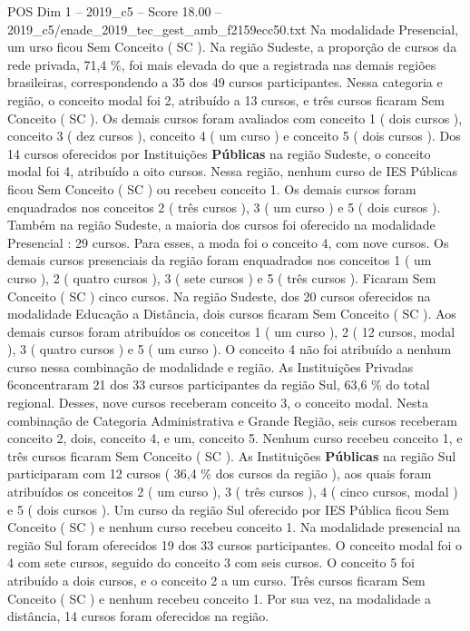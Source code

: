 \begin{textsample}{POS Dim 1 – 2019\_c5 – Score 18.00 – 2019\_c5/enade\_2019\_tec\_gest\_amb\_f2159ecc50.txt}
Na modalidade Presencial, um urso ficou Sem Conceito ( SC ).
Na região Sudeste, a proporção de cursos da rede privada, 71,4 \%, foi mais elevada do que a registrada nas demais regiões brasileiras, correspondendo a 35 dos 49 cursos participantes.
Nessa categoria e região, o conceito modal foi 2, atribuído a 13 cursos, e três cursos ficaram Sem Conceito ( SC ).
Os demais cursos foram avaliados com conceito 1 ( dois cursos ), conceito 3 ( dez cursos ), conceito 4 ( um curso ) e conceito 5 ( dois cursos ).
Dos 14 cursos oferecidos por Instituições \textbf{Públicas} na região Sudeste, o conceito modal foi 4, atribuído a oito cursos.
Nessa região, nenhum curso de IES Públicas ficou Sem Conceito ( SC ) ou recebeu conceito 1.
Os demais cursos foram enquadrados nos conceitos 2 ( três cursos ), 3 ( um curso ) e 5 ( dois cursos ).
Também na região Sudeste, a maioria dos cursos foi oferecido na modalidade Presencial : 29 cursos.
Para esses, a moda foi o conceito 4, com nove cursos.
Os demais cursos presenciais da região foram enquadrados nos conceitos 1 ( um curso ), 2 ( quatro cursos ), 3 ( sete cursos ) e 5 ( três cursos ).
Ficaram Sem Conceito ( SC ) cinco cursos.
Na região Sudeste, dos 20 cursos oferecidos na modalidade Educação a Distância, dois cursos ficaram Sem Conceito ( SC ).
Aos demais cursos foram atribuídos os conceitos 1 ( um curso ), 2 ( 12 cursos, modal ), 3 ( quatro cursos ) e 5 ( um curso ).
O conceito 4 não foi atribuído a nenhum curso nessa combinação de modalidade e região.
As Instituições Privadas 6concentraram 21 dos 33 cursos participantes da região Sul, 63,6 \% do total regional.
Desses, nove cursos receberam conceito 3, o conceito modal.
Nesta combinação de Categoria Administrativa e Grande Região, seis cursos receberam conceito 2, dois, conceito 4, e um, conceito 5.
Nenhum curso recebeu conceito 1, e três cursos ficaram Sem Conceito ( SC ).
As Instituições \textbf{Públicas} na região Sul participaram com 12 cursos ( 36,4 \% dos cursos da região ), aos quais foram atribuídos os conceitos 2 ( um curso ), 3 ( três cursos ), 4 ( cinco cursos, modal ) e 5 ( dois cursos ).
Um curso da região Sul oferecido por IES Pública ficou Sem Conceito ( SC ) e nenhum curso recebeu conceito 1.
Na modalidade presencial na região Sul foram oferecidos 19 dos 33 cursos participantes.
O conceito modal foi o 4 com sete cursos, seguido do conceito 3 com seis cursos.
O conceito 5 foi atribuído a dois cursos, e o conceito 2 a um curso.
Três cursos ficaram Sem Conceito ( SC ) e nenhum recebeu conceito 1.
Por sua vez, na modalidade a distância, 14 cursos foram oferecidos na região.

\end{textsample}
